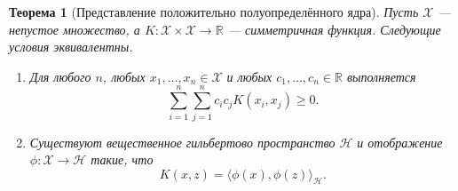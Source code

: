 \documentclass[12pt,a4paper]{article}
\newtheorem{theorem}{Теорема}[section]
\theoremstyle{definition}
\newcommand{\R}{\mathbb{R}}
\newcommand{\1}{\mathbf{1}}
\begin{document}
\begin{theorem}[Представление положительно полуопределённого ядра]
Пусть $\mathcal{X}$ --- непустое множество, а
$K:\mathcal{X}\times\mathcal{X}\to\R$ --- симметричная функция.
Следующие условия эквивалентны.

\begin{enumerate}
    \item Для любого $n$, любых
    $x_1,\ldots,x_n\in\mathcal{X}$ и любых
    $c_1,\ldots,c_n\in\R$ выполняется
    \[
        \sum_{i=1}^{n}
        \sum_{j=1}^{n}
        c_ic_jK(x_i,x_j)\geq0.
    \]
    \item Существуют вещественное гильбертово пространство
    $\mathcal{H}$ и отображение
    $\phi:\mathcal{X}\to\mathcal{H}$ такие, что
    \[
        K(x,z)
        =
        \langle\phi(x),\phi(z)\rangle_{\mathcal{H}}.
    \]
\end{enumerate}
\end{theorem}
\end{document}
